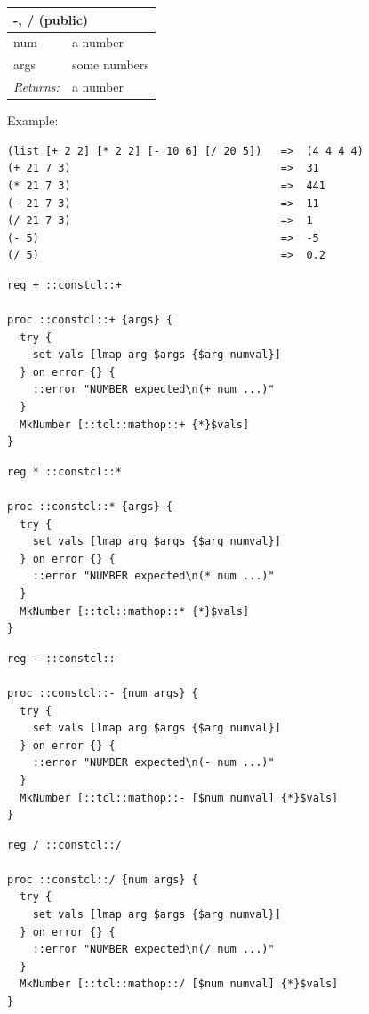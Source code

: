 \documentclass[twoside,9pt]{report}
\begin{document}
\begin{tabular}{ |l l| }
\hline
\multicolumn{2}{|l|}{-, / (public)} \\
\hline
num & a number \\
args & some numbers \\
\textit{Returns:} & a number \\
\hline
\end{tabular}


Example:

\noindent\makebox[\linewidth]{\rule{\linewidth}{0.4pt}}
\begin{lstlisting}
(list [+ 2 2] [* 2 2] [- 10 6] [/ 20 5])   =>  (4 4 4 4)
(+ 21 7 3)                                 =>  31
(* 21 7 3)                                 =>  441
(- 21 7 3)                                 =>  11
(/ 21 7 3)                                 =>  1
(- 5)                                      =>  -5
(/ 5)                                      =>  0.2
\end{lstlisting}
\noindent\makebox[\linewidth]{\rule{\linewidth}{0.4pt}}
\noindent\makebox[\linewidth]{\rule{\linewidth}{0.4pt}}
\begin{lstlisting}
reg + ::constcl::+
 
proc ::constcl::+ {args} {
  try {
    set vals [lmap arg $args {$arg numval}]
  } on error {} {
    ::error "NUMBER expected\n(+ num ...)"
  }
  MkNumber [::tcl::mathop::+ {*}$vals]
}
\end{lstlisting}
\noindent\makebox[\linewidth]{\rule{\linewidth}{0.4pt}}
\noindent\makebox[\linewidth]{\rule{\linewidth}{0.4pt}}
\begin{lstlisting}
reg * ::constcl::*
 
proc ::constcl::* {args} {
  try {
    set vals [lmap arg $args {$arg numval}]
  } on error {} {
    ::error "NUMBER expected\n(* num ...)"
  }
  MkNumber [::tcl::mathop::* {*}$vals]
}
\end{lstlisting}
\noindent\makebox[\linewidth]{\rule{\linewidth}{0.4pt}}
\noindent\makebox[\linewidth]{\rule{\linewidth}{0.4pt}}
\begin{lstlisting}
reg - ::constcl::-
 
proc ::constcl::- {num args} {
  try {
    set vals [lmap arg $args {$arg numval}]
  } on error {} {
    ::error "NUMBER expected\n(- num ...)"
  }
  MkNumber [::tcl::mathop::- [$num numval] {*}$vals]
}
\end{lstlisting}
\noindent\makebox[\linewidth]{\rule{\linewidth}{0.4pt}}
\noindent\makebox[\linewidth]{\rule{\linewidth}{0.4pt}}
\begin{lstlisting}
reg / ::constcl::/
 
proc ::constcl::/ {num args} {
  try {
    set vals [lmap arg $args {$arg numval}]
  } on error {} {
    ::error "NUMBER expected\n(/ num ...)"
  }
  MkNumber [::tcl::mathop::/ [$num numval] {*}$vals]
}
\end{lstlisting}
\noindent\makebox[\linewidth]{\rule{\linewidth}{0.4pt}}
\end{document}
